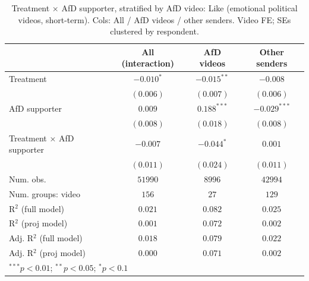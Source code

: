 
\begin{table}
\begin{center}
\begin{tabular}{l c c c}
\hline
 & All (interaction) & AfD videos & Other senders \\
\hline
Treatment                 & $-0.010^{*}$ & $-0.015^{**}$ & $-0.008$       \\
                          & $(0.006)$    & $(0.007)$     & $(0.006)$      \\
AfD supporter             & $0.009$      & $0.188^{***}$ & $-0.029^{***}$ \\
                          & $(0.008)$    & $(0.018)$     & $(0.008)$      \\
Treatment × AfD supporter & $-0.007$     & $-0.044^{*}$  & $0.001$        \\
                          & $(0.011)$    & $(0.024)$     & $(0.011)$      \\
\hline
Num. obs.                 & $51990$      & $8996$        & $42994$        \\
Num. groups: video        & $156$        & $27$          & $129$          \\
R$^2$ (full model)        & $0.021$      & $0.082$       & $0.025$        \\
R$^2$ (proj model)        & $0.001$      & $0.072$       & $0.002$        \\
Adj. R$^2$ (full model)   & $0.018$      & $0.079$       & $0.022$        \\
Adj. R$^2$ (proj model)   & $0.000$      & $0.071$       & $0.002$        \\
\hline
\multicolumn{4}{l}{\scriptsize{$^{***}p<0.01$; $^{**}p<0.05$; $^{*}p<0.1$}}
\end{tabular}
\caption{Treatment × AfD supporter, stratified by AfD video: Like (emotional political videos, short-term). Cols: All / AfD videos / other senders. Video FE; SEs clustered by respondent.}
\label{tab:afd_video_hetero_like}
\end{center}
\end{table}

